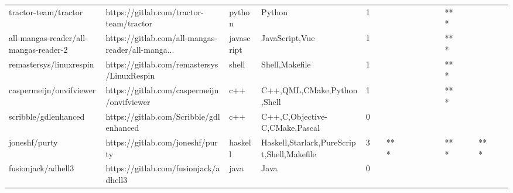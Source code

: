 \begin{tabular}{llllrlllllllllllll}
tractor-team/tractor                               &            https://gitlab.com/tractor-team/tractor &            python &                                             Python &       1 &         &        &           &                &                 &        &           &       *** &          &          &       &              &          \\
all-mangas-reader/all-mangas-reader-2              &  https://gitlab.com/all-mangas-reader/all-manga... &        javascript &                                     JavaScript,Vue &       1 &         &        &           &                &                 &        &           &       *** &          &          &       &              &          \\
remastersys/linuxrespin                            &         https://gitlab.com/remastersys/LinuxRespin &             shell &                                     Shell,Makefile &       1 &         &        &           &                &                 &        &           &       *** &          &          &       &              &          \\
caspermeijn/onvifviewer                            &         https://gitlab.com/caspermeijn/onvifviewer &               c++ &                         C++,QML,CMake,Python,Shell &       1 &         &        &           &                &                 &        &           &       *** &          &          &       &              &          \\
scribble/gdlenhanced                               &            https://gitlab.com/Scribble/gdlenhanced &               c++ &                     C++,C,Objective-C,CMake,Pascal &       0 &         &        &           &                &                 &        &           &           &          &          &       &              &          \\
joneshf/purty                                      &                   https://gitlab.com/joneshf/purty &           haskell &         Haskell,Starlark,PureScript,Shell,Makefile &       3 &         &    *** &           &                &                 &        &           &       *** &          &          &   *** &              &          \\
fusionjack/adhell3                                 &              https://gitlab.com/fusionjack/adhell3 &              java &                                               Java &       0 &         &        &           &                &                 &        &           &           &          &          &       &              &          \\

\end{tabular}
